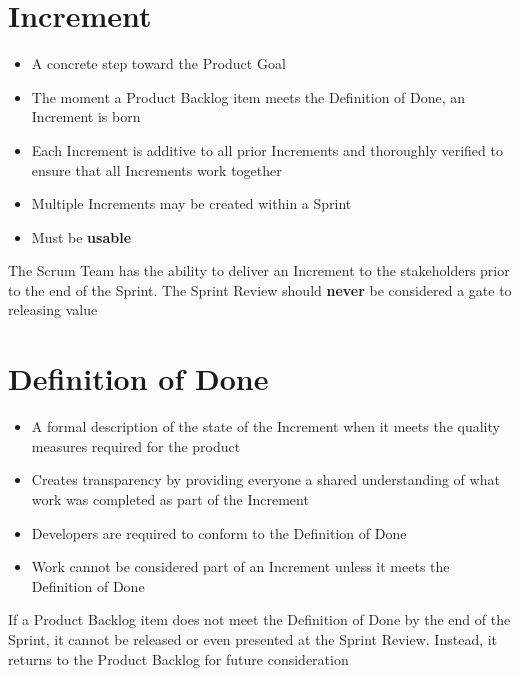 \documentclass[a4paper,11pt,twocolumn]{article}
\begin{document}
\section*{Increment}
\begin{itemize}
	\item A concrete step toward the Product Goal
	\item The moment a Product Backlog item meets the Definition of Done, an Increment is born
	\item Each Increment is additive to all prior Increments and thoroughly verified to ensure that all Increments work together
	\item Multiple Increments may be created within a Sprint
	\item Must be \textbf{usable}
\end{itemize}

\begin{tcolorbox}[colback=black!8!white,colframe=gray!50!black,title=Note,sharp corners,fonttitle=\normalsize\bfseries,fontupper=\normalsize,left=0.7em,right=0.7em]
	The Scrum Team has the ability to deliver an Increment to the stakeholders prior to the end of the Sprint. The Sprint Review should \textbf{never} be considered a gate to releasing value
\end{tcolorbox}

\section*{Definition of Done}
\begin{itemize}
	\item A formal description of the state of the Increment when it meets the quality measures required for the product
	\item Creates transparency by providing everyone a shared understanding of what work was completed as part of the Increment
	\item Developers are required to conform to the Definition of Done
	\item Work cannot be considered part of an Increment unless it meets the Definition of Done
\end{itemize}

\begin{tcolorbox}[colback=black!8!white,colframe=gray!50!black,title=Note,sharp corners,fonttitle=\normalsize\bfseries,fontupper=\normalsize,left=0.7em,right=0.7em]
	If a Product Backlog item does not meet the Definition of Done by the end of the Sprint, it cannot be released or even presented at the Sprint Review. Instead, it returns to the Product Backlog for future consideration
\end{tcolorbox}
\end{document}
